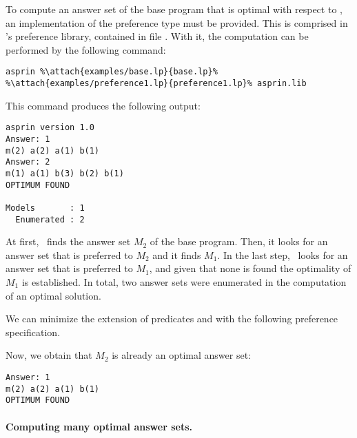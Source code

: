 \begin{example}
To compute an answer set of the base program that is optimal with respect to , 
an implementation of the preference type  must be provided.
This is comprised in \asprin's preference library,
contained in file .
With it, the computation can be performed by the following command:
%
%
\begin{lstlisting}[numbers=none,escapechar=\%]
asprin %\attach{examples/base.lp}{base.lp}% %\attach{examples/preference1.lp}{preference1.lp}% asprin.lib
\end{lstlisting}
%
This command produces the following output:
%
\begin{lstlisting}[numbers=none]
asprin version 1.0
Answer: 1
m(2) a(2) a(1) b(1)
Answer: 2
m(1) a(1) b(3) b(2) b(1)
OPTIMUM FOUND

Models       : 1
  Enumerated : 2

\end{lstlisting}
%
At first, \asprin\ finds the answer set $M_2$ of the base program. 
Then, it looks for an answer set that is preferred to $M_2$ and it finds $M_1$. 
In the last step, \asprin\ looks for an answer set that is preferred to $M_1$,  
and given that none is found the optimality of $M_1$ is established. 
In total, two answer sets were enumerated in the computation of an optimal solution.

We can minimize the extension of predicates  and  with the following preference specification.
%

%
Now, we obtain that $M_2$ is already an optimal answer set: 
\begin{lstlisting}[numbers=none]
Answer: 1
m(2) a(2) a(1) b(1)
OPTIMUM FOUND
\end{lstlisting}
\end{example}

\paragraph{Computing many optimal answer sets.}

